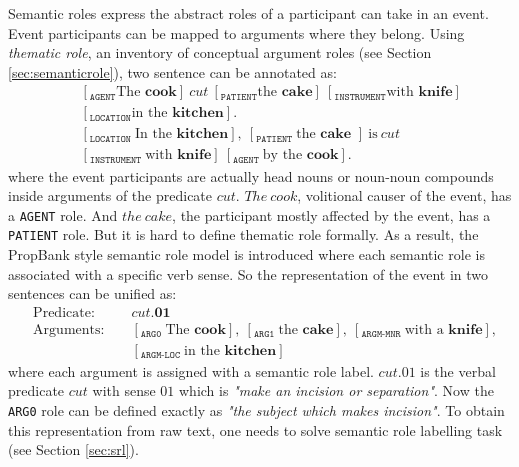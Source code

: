 \documentclass[a4paper]{article}
\begin{document}
Semantic roles express the abstract roles of a participant can take in an event. Event participants can be mapped to arguments where they belong. Using \textit{thematic role}, an inventory of conceptual argument roles (see Section \ref{sec:semanticrole}), two sentence can be annotated as: 
\begin{eqnarray} \label{eg:thematic}
    \nonumber & &[_{\texttt{AGENT}} \text{The }\textbf{cook}]\ cut\ [_{\texttt{PATIENT}}\text{the }\textbf{cake}]\ [_{\texttt{INSTRUMENT}}\text{with }\textbf{knife}]\\  
    &   &[_{\texttt{LOCATION}}\text{in the }\textbf{kitchen}]. \\
    \nonumber & &[_{\texttt{LOCATION }}\text{In the }\textbf{kitchen}],\ [_{\texttt{PATIENT }}\text{the }\textbf{cake }]\ \text{is} \ cut\ \\
    &   &[_{\texttt{INSTRUMENT }}\text{with }\textbf{knife}]\ [_{\texttt{AGENT }}\text{by the }\textbf{cook}]. 
\end{eqnarray} 
where the event participants are actually head nouns or noun-noun compounds inside arguments of the predicate $cut$. $The\ cook$, volitional causer of the event, has a \texttt{AGENT} role. And $the\ cake$, the participant mostly affected by the event, has a \texttt{PATIENT} role. But it is hard to define thematic role formally. As a result, the PropBank \citep{palmer2005proposition} style semantic role model is introduced where each semantic role is associated with a specific verb sense. So the representation of the event in two sentences can be unified as: 
\begin{equation*} \label{eg:probank}
\begin{aligned}
    & \text{Predicate: }&&cut.\textbf{01} \\
    & \text{Arguments: }&&[_{\texttt{ARG0 }}\text{The }\textbf{cook}], \ [_{\texttt{ARG1 }}\text{the }\textbf{cake}], \ [_{\texttt{ARGM-MNR }}\text{with a }\textbf{knife}], \\
    &                   &&[_{\texttt{ARGM-LOC }}\text{in the }\textbf{kitchen}]
\end{aligned}
\end{equation*} 
where each argument is assigned with a semantic role label. $cut.01$ is the verbal predicate $cut$ with sense $01$ which is \textit{"make an incision or separation"}. Now the \texttt{ARG0} role can be defined exactly as \textit{"the subject which makes incision"}. To obtain this representation from raw text, one needs to solve semantic role labelling task (see Section \ref{sec:srl}). 
\end{document}
